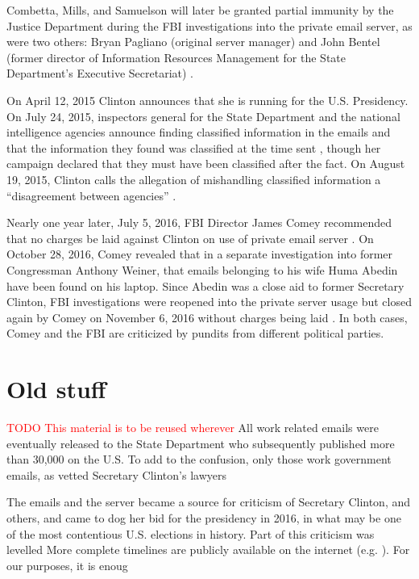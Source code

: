 \documentclass[journal]{vgtc}                %
\newcommand*{\TODO}[1]{\textcolor{red}{TODO #1}}
\begin{document}
Combetta, Mills, and Samuelson will later be granted partial immunity by the Justice Department during the FBI investigations into the private email server, as were two others: Bryan Pagliano (original server manager) and  John Bentel (former director of Information Resources Management for the State Department's Executive Secretariat) \cite{immunityPolitico, immunityDailyCaller, immunityIT}.  

On April 12, 2015 Clinton announces that she is running for the U.S. Presidency.  On July 24, 2015, inspectors general for the State Department  and the national intelligence agencies announce finding classified information in the emails and that the information they found was classified at the time sent \cite{serverClasssified}, though her campaign declared that they must have been classified after the fact. On August 19, 2015, Clinton calls the allegation of mishandling classified information a ``disagreement between agencies'' \cite{clintonDenialGuardian}.

Nearly one year later, July 5, 2016,  FBI Director James Comey recommended that no charges be laid against Clinton on use of private email server \cite{nochargeFBI}.  On October 28, 2016, Comey revealed that in a separate investigation into former Congressman Anthony Weiner, that emails belonging to his wife Huma Abedin have been found on his laptop.  Since Abedin was a close aid to former Secretary Clinton, FBI investigations were reopened into the private server usage but closed again by Comey on November 6, 2016 without charges being laid \cite{nochargeFBINov}.  In both cases, Comey and the FBI are criticized by pundits from different political parties.

\section{Old stuff}
\TODO{This material is to be reused wherever}
All work related emails were eventually released to the State Department who subsequently published more than 30,000 on the U.S.  To add to the confusion, only those work government emails, as vetted Secretary Clinton's lawyers 

The emails and the server became a source for criticism of Secretary Clinton, and others, and came to dog her bid for the presidency in 2016, in what may be one of the most contentious U.S. elections in history.   Part of this criticism was levelled  More complete timelines are publicly available on the internet (e.g. \cite{attkissonTimeline, TimeMagEverything, clintonWikipedia}).  For our purposes, it is enoug
 
\end{document}
